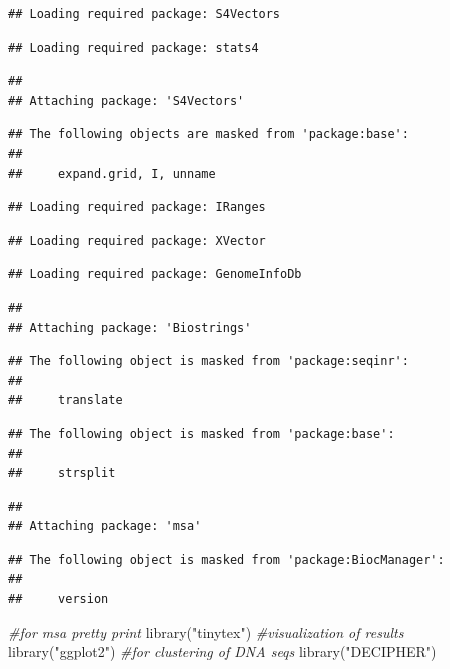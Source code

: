 \documentclass[
]{article}
\newenvironment{Shaded}{\begin{snugshade}}{\end{snugshade}}
\newcommand{\CommentTok}[1]{\textcolor[rgb]{0.56,0.35,0.01}{\textit{#1}}}
\newcommand{\FunctionTok}[1]{\textcolor[rgb]{0.00,0.00,0.00}{#1}}
\newcommand{\NormalTok}[1]{#1}
\newcommand{\StringTok}[1]{\textcolor[rgb]{0.31,0.60,0.02}{#1}}
\begin{document}
\begin{verbatim}
## Loading required package: S4Vectors
\end{verbatim}

\begin{verbatim}
## Loading required package: stats4
\end{verbatim}

\begin{verbatim}
## 
## Attaching package: 'S4Vectors'
\end{verbatim}

\begin{verbatim}
## The following objects are masked from 'package:base':
## 
##     expand.grid, I, unname
\end{verbatim}

\begin{verbatim}
## Loading required package: IRanges
\end{verbatim}

\begin{verbatim}
## Loading required package: XVector
\end{verbatim}

\begin{verbatim}
## Loading required package: GenomeInfoDb
\end{verbatim}

\begin{verbatim}
## 
## Attaching package: 'Biostrings'
\end{verbatim}

\begin{verbatim}
## The following object is masked from 'package:seqinr':
## 
##     translate
\end{verbatim}

\begin{verbatim}
## The following object is masked from 'package:base':
## 
##     strsplit
\end{verbatim}

\begin{verbatim}
## 
## Attaching package: 'msa'
\end{verbatim}

\begin{verbatim}
## The following object is masked from 'package:BiocManager':
## 
##     version
\end{verbatim}

\begin{Shaded}
\begin{Highlighting}[]
\CommentTok{\#for msa pretty print }
\FunctionTok{library}\NormalTok{(}\StringTok{"tinytex"}\NormalTok{)}
\CommentTok{\#visualization of results }
\FunctionTok{library}\NormalTok{(}\StringTok{"ggplot2"}\NormalTok{)}
\CommentTok{\#for clustering of DNA seqs }
\FunctionTok{library}\NormalTok{(}\StringTok{"DECIPHER"}\NormalTok{)}
\end{Highlighting}
\end{Shaded}
\end{document}

